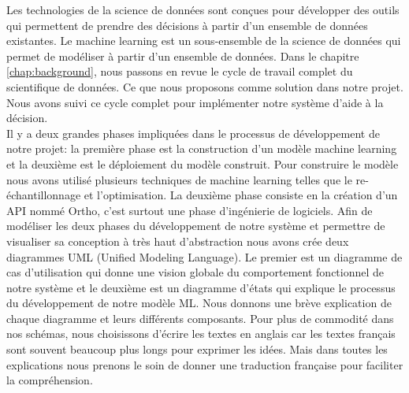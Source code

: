 \documentclass[12pt, french]{report}
\begin{document}
Les technologies de la science de données sont conçues pour développer des outils qui permettent de prendre des décisions à partir d'un ensemble de données existantes. Le machine learning est un sous-ensemble de la science de données qui permet de modéliser à partir d'un ensemble de données. Dans le chapitre \ref{chap:background}, nous passons en revue le cycle de travail complet du scientifique de données. Ce que nous proposons comme solution dans notre projet. Nous avons suivi ce cycle complet pour implémenter notre système d'aide à la décision. \\

Il y a deux grandes phases impliquées dans le processus de développement de notre projet: la première phase est la construction d'un modèle machine learning et la deuxième est le déploiement du modèle construit. Pour construire le modèle nous avons utilisé plusieurs techniques de machine learning telles que le re-échantillonnage et l'optimisation.  La deuxième phase consiste en la création d'un API nommé Ortho, c'est surtout une phase d'ingénierie de logiciels. Afin de modéliser les deux phases du développement de notre système et permettre de visualiser sa conception à très haut d'abstraction nous avons crée deux diagrammes UML (Unified Modeling Language). Le premier est un diagramme de cas d'utilisation qui donne une vision globale du comportement fonctionnel de notre système et le deuxième est un diagramme d'états qui explique le processus du développement de notre modèle ML. Nous donnons une brève explication de chaque diagramme et leurs différents composants. Pour plus de commodité dans nos schémas, nous choisissons d'écrire les textes en anglais car les textes français sont souvent beaucoup plus longs pour exprimer les idées. Mais dans toutes les explications nous prenons le soin de donner une traduction française pour faciliter la compréhension.\\
\end{document}

